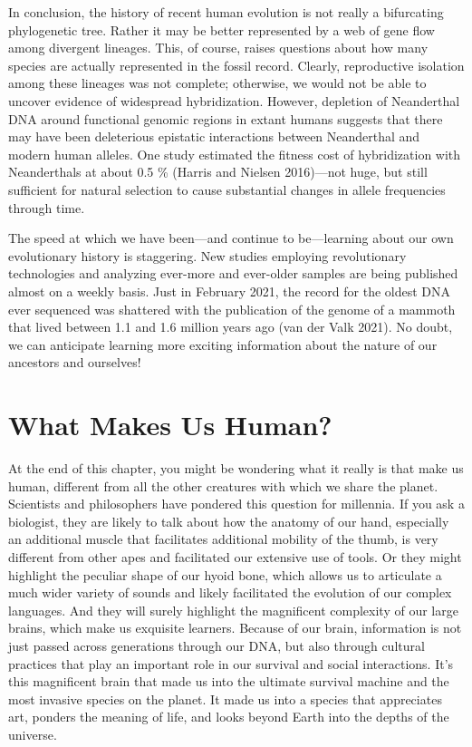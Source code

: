 \documentclass[
]{book}
\begin{document}
In conclusion, the history of recent human evolution is not really a bifurcating phylogenetic tree. Rather it may be better represented by a web of gene flow among divergent lineages. This, of course, raises questions about how many species are actually represented in the fossil record. Clearly, reproductive isolation among these lineages was not complete; otherwise, we would not be able to uncover evidence of widespread hybridization. However, depletion of Neanderthal DNA around functional genomic regions in extant humans suggests that there may have been deleterious epistatic interactions between Neanderthal and modern human alleles. One study estimated the fitness cost of hybridization with Neanderthals at about 0.5 \% (Harris and Nielsen 2016)---not huge, but still sufficient for natural selection to cause substantial changes in allele frequencies through time.

The speed at which we have been---and continue to be---learning about our own evolutionary history is staggering. New studies employing revolutionary technologies and analyzing ever-more and ever-older samples are being published almost on a weekly basis. Just in February 2021, the record for the oldest DNA ever sequenced was shattered with the publication of the genome of a mammoth that lived between 1.1 and 1.6 million years ago (van der Valk 2021). No doubt, we can anticipate learning more exciting information about the nature of our ancestors and ourselves!

\hypertarget{what-makes-us-human}{%
\section{What Makes Us Human?}\label{what-makes-us-human}}

At the end of this chapter, you might be wondering what it really is that make us human, different from all the other creatures with which we share the planet. Scientists and philosophers have pondered this question for millennia. If you ask a biologist, they are likely to talk about how the anatomy of our hand, especially an additional muscle that facilitates additional mobility of the thumb, is very different from other apes and facilitated our extensive use of tools. Or they might highlight the peculiar shape of our hyoid bone, which allows us to articulate a much wider variety of sounds and likely facilitated the evolution of our complex languages. And they will surely highlight the magnificent complexity of our large brains, which make us exquisite learners. Because of our brain, information is not just passed across generations through our DNA, but also through cultural practices that play an important role in our survival and social interactions. It's this magnificent brain that made us into the ultimate survival machine and the most invasive species on the planet. It made us into a species that appreciates art, ponders the meaning of life, and looks beyond Earth into the depths of the universe.
\end{document}
